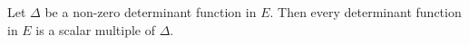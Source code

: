 Let $\Delta$ be a non-zero determinant function in $E$. Then every determinant function in $E$ is a scalar multiple of $\Delta$.
